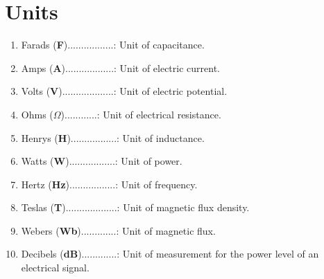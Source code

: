 \documentclass{article}
\begin{document}
\section{Units}

\begin{enumerate}
    \item Farads (\textbf{F}).................: Unit of capacitance.
    \item Amps (\textbf{A})..................: Unit of electric current.
    \item Volts (\textbf{V})...................: Unit of electric potential.
    \item Ohms (\textbf{$\Omega$})............: Unit of electrical resistance.
    \item Henrys (\textbf{H}).................: Unit of inductance.
    \item Watts (\textbf{W}).................: Unit of power.
    \item Hertz (\textbf{Hz}).................: Unit of frequency.
    \item Teslas (\textbf{T})...................: Unit of magnetic flux density.
    \item Webers (\textbf{Wb}).............: Unit of magnetic flux.
    \item Decibels (\textbf{dB}).............: Unit of measurement for the power level of an electrical signal.
\end{enumerate}

\end{document}
